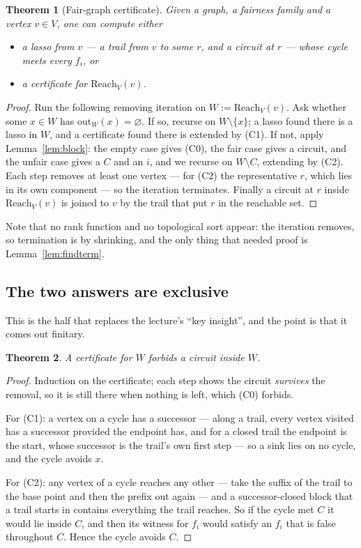 \documentclass[11pt,a4paper]{article}
\newtheorem{theorem}{Theorem}[section]
\theoremstyle{definition}
\newcommand{\Reach}{\mathrm{Reach}}
\newcommand{\outs}{\mathrm{out}}
\begin{document}
\begin{theorem}[Fair-graph certificate]\label{thm:fairgraph}
Given a graph, a fairness family and a vertex $v\in V$, one can compute either
\begin{itemize}
\item[(a)] a lasso from $v$ --- a trail from $v$ to some $r$, and a circuit at
  $r$ --- whose cycle meets every $f_i$, or
\item[(b)] a certificate for $\Reach_V(v)$.
\end{itemize}
\end{theorem}

\begin{proof}
Run the following removing iteration on $W:=\Reach_V(v)$.  Ask whether some
$x\in W$ has $\outs_W(x)=\varnothing$.  If so, recurse on $W\setminus\{x\}$;
a lasso found there is a lasso in $W$, and a certificate found there is
extended by (C1).  If not, apply Lemma~\ref{lem:block}: the empty case gives
(C0), the fair case gives a circuit, and the unfair case gives a $C$ and an $i$,
and we recurse on $W\setminus C$, extending by (C2).  Each step removes at least
one vertex --- for (C2) the representative $r$, which lies in its own component
--- so the iteration terminates.  Finally a circuit at $r$ inside $\Reach_V(v)$
is joined to $v$ by the trail that put $r$ in the reachable set.
\end{proof}

Note that no rank function and no topological sort appear: the iteration
removes, so termination is by shrinking, and the only thing that needed proof
is Lemma~\ref{lem:findterm}.

\subsection*{The two answers are exclusive}

This is the half that replaces the lecture's ``key insight'', and the point is
that it comes out finitary.

\begin{theorem}\label{thm:nocirc}
A certificate for $W$ forbids a circuit inside $W$.
\end{theorem}

\begin{proof}
Induction on the certificate; each step shows the circuit \emph{survives} the
removal, so it is still there when nothing is left, which (C0) forbids.

For (C1): a vertex on a cycle has a successor --- along a trail, every vertex
visited has a successor provided the endpoint has, and for a closed trail the
endpoint is the start, whose successor is the trail's own first step --- so a
sink lies on no cycle, and the cycle avoids $x$.

For (C2): any vertex of a cycle reaches any other --- take the suffix of the
trail to the base point and then the prefix out again --- and a successor-closed
block that a trail starts in contains everything the trail reaches.  So if the
cycle met $C$ it would lie inside $C$, and then its witness for $f_i$ would
satisfy an $f_i$ that is false throughout $C$.  Hence the cycle avoids $C$.
\end{proof}
\end{document}
